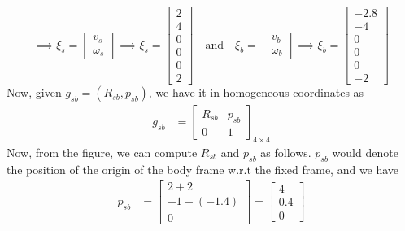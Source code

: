 \begin{equation*}
    \implies
    \xi_{s}
    =
    \begin{bmatrix}
        v_{s} \\
        \omega_{s}
    \end{bmatrix}
    \implies
    \boxed{
        \xi_{s}
        =
        \begin{bmatrix}
            2 \\
            4 \\
            0 \\
            0 \\
            0 \\
            2
        \end{bmatrix}
    }
    \quad \text{and} \quad
    \xi_{b}
    =
    \begin{bmatrix}
        v_{b} \\
        \omega_{b}
    \end{bmatrix}
    \implies
    \boxed{
        \xi_{b}
        =
        \begin{bmatrix}
            -2.8 \\
            -4   \\
            0    \\
            0    \\
            0    \\
            -2
        \end{bmatrix}
    }
\end{equation*}
Now, given \( g_{s b} = (R_{s b}, p_{s b}) \), we have it in homogeneous coordinates as
\begin{align*}
    g_{s b}
     & =
    \begin{bmatrix}
        R_{s b} & p_{s b} \\
        0       & 1
    \end{bmatrix}_{4 \times 4}
\end{align*}
Now, from the figure, we can compute \( R_{s b} \) and \( p_{s b} \) as follows.
\( p_{s b} \) would denote the position of the origin of the body frame w.r.t the fixed frame, and we have
\begin{align*}
    p_{s b}
     & =
    \begin{bmatrix}
        2 + 2       \\
        -1 - (-1.4) \\
        0
    \end{bmatrix}
    =
    \begin{bmatrix}
        4   \\
        0.4 \\
        0
    \end{bmatrix}
\end{align*}
